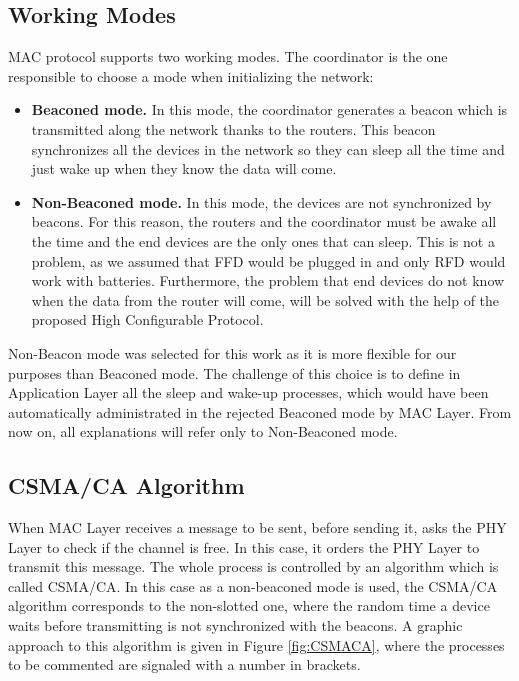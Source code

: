 \subsection{Working Modes}

\ac{MAC} protocol supports two working modes. The coordinator is the one responsible to choose a mode when initializing the network:

\begin{itemize}
 \item \textbf{Beaconed mode.} In this mode, the coordinator generates a beacon which is transmitted along the network thanks to the routers.
This beacon synchronizes all the devices in the network so they can sleep all the time and just wake up when they know the data will come. 
 \item \textbf{Non-Beaconed mode.} In this mode, the devices are not synchronized by beacons. For this reason, the routers and the coordinator must
be awake all the time and the end devices are the only ones that can sleep. This is not a problem, as we assumed that \ac{FFD} would be plugged 
in and only \ac{RFD} would work with batteries. Furthermore, the problem that end devices do not know when the data from the router will come, 
will be solved with the help of the proposed High Configurable Protocol.
\end{itemize}

Non-Beacon mode was selected for this work as it is more flexible for our purposes than Beaconed mode. The challenge of this choice is to 
define in Application Layer all the sleep and wake-up processes, which would have been automatically administrated in the rejected Beaconed
mode by \ac{MAC} Layer. From now on, all explanations will refer only to Non-Beaconed mode.

\subsection{\ac{CSMA/CA} Algorithm}

When \ac{MAC} Layer receives a message to be sent, before sending it, asks the \ac{PHY} Layer to check if the channel is free. In this case, it 
orders the \ac{PHY} Layer to transmit this message. The whole process is controlled by an algorithm which is called \ac{CSMA/CA}. In this 
case as a non-beaconed mode is used, the \ac{CSMA/CA} algorithm corresponds to the non-slotted one, where the random time a device waits 
before transmitting is not synchronized with the beacons. A graphic approach to this algorithm is given in Figure \ref{fig:CSMACA}, where the
processes to be commented are signaled with a number in brackets.

